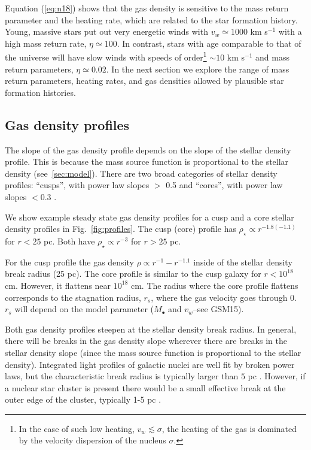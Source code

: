 \documentclass[usenatbib,fleqn]{mnras}
\newcommand{\Mbh}[1][]{M_{\bullet#1}}
\begin{document}
Equation (\ref{eq:n18}) shows that the gas density is sensitive to the
mass return parameter and the heating rate, which are related to the
star formation history. Young, massive stars put out very energetic
winds with $v_w\simeq 1000$ km s$^{-1}$ with a high mass return rate,
$\eta\simeq 100$.  In contrast, stars with age comparable to that of
the universe will have slow winds with speeds of order\footnote{In the
  case of such low heating, $v_w \lesssim \sigma$, the heating of the
  gas is dominated by the velocity dispersion of the nucleus
  $\sigma$.} $\sim 10$ km s$^{-1}$ and mass return parameters,
$\eta\simeq0.02$. In the next section we explore the range of mass
return parameters, heating rates, and gas densities allowed by
plausible star formation histories.

\subsection{Gas density profiles}
The slope of the gas density profile depends on the slope of the
stellar density profile.  This is because the  mass source function is
proportional to the stellar density (see~\ref{sec:model}). There are
two broad categories of stellar density profiles: ``cusps'', with power
law slopes $>$ 0.5  and ``cores'', with power law slopes $<0.3$ \citep{Lauer+2007}.

We show example steady state gas density profiles for a cusp and a
core stellar density profiles in Fig.~\ref{fig:profiles}. The cusp
(core) profile has $\rho_\star \propto r^{-1.8 (-1.1)}$ for $r < 25$
pc. Both have $\rho_\star \propto r^{-3}$ for $r > 25$ pc.

For the cusp profile the gas density $\rho \propto r^{-1}-r^{-1.1}$
inside of the stellar density break radius (25 pc).  The core profile
is similar to the cusp galaxy for $r<10^{18}$ cm. However, it flattens near
$10^{18}$ cm.  The radius where the core profile flattens corresponds
to the stagnation radius, $r_s$, where the gas velocity goes through
0.  $r_s$ will depend on the model parameter ($\Mbh$ and $v_w$--see
GSM15).

Both gas density profiles steepen at the stellar density break
radius. In general, there will be breaks in the gas density slope
wherever there are breaks in the stellar density slope (since the mass
source function is proportional to the stellar density).  Integrated
light profiles of galactic nuclei are well fit by broken power laws,
but the characteristic break radius is typically larger than $5 $ pc
\citep{Lauer+2007}. However, if a nuclear star cluster is present
there would be a small effective break at the outer edge of the
cluster, typically 1-5 pc \citep{Georgiev+2014}.
\end{document}
